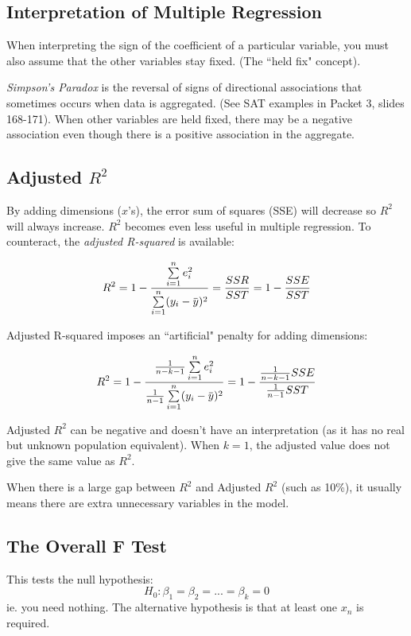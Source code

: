\documentclass[11pt, oneside]{article}   	%
\newcommand{\overbar}[1]{\mkern 1.5mu\overline{\mkern-1.5mu#1\mkern-1.5mu}\mkern 1.5mu}
\begin{document}
\subsection{Interpretation of Multiple Regression}

When interpreting the sign of the coefficient of a particular variable, you must also assume that the other variables stay fixed. (The ``held fix" concept).

\textit{Simpson's Paradox} is the reversal of signs of directional associations that sometimes occurs when data is aggregated. (See SAT examples in Packet 3, slides 168-171). When other variables are held fixed, there may be a negative association even though there is a positive association in the aggregate.

\subsection{Adjusted $R^2$}

By adding dimensions ($x$'s), the error sum of squares (SSE) will decrease so $R^2$ will always increase. $R^2$ becomes even less useful in multiple regression. To counteract, the \textit{adjusted R-squared} is available:

\[
R^2 = 1 - \frac{ \sum\limits_{i=1}^n e^2_i} {\sum\limits_{i=1}^n (y_i - \overbar{y})^2} = \frac{SSR}{SST} =  1 - \frac{SSE}{SST}
\]

Adjusted R-squared imposes an ``artificial" penalty for adding dimensions:

\[
R^2 = 1 - \frac{ \frac{1}{n-k-1} \sum\limits_{i=1}^n e^2_i} {\frac{1}{n-1} \sum\limits_{i=1}^n (y_i - \overbar{y})^2}  =  1 - \frac{ \frac{1}{n-k-1}SSE}{\frac{1}{n-1}SST}
\]

Adjusted $R^2$ can be negative and doesn't have an interpretation (as it has no real but unknown population equivalent).  When $k=1$, the adjusted value does not give the same value as $R^2$.

When there is a large gap between $R^2$ and Adjusted $R^2$ (such as 10\%), it usually means there are extra unnecessary variables in the model.

\subsection{The Overall F Test}

This tests the null hypothesis:
\[
H_0 : \beta_1 = \beta_2 = ... = \beta_k = 0
\]
ie. you need nothing. The alternative hypothesis is that at least one $x_n$ is required.
\end{document}

